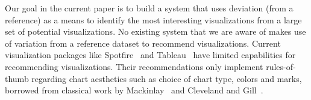 




Our goal in the current paper is to build a system that uses deviation (from a reference) as a means to identify
the most interesting visualizations from a large set of potential visualizations.
No existing system that we are aware of makes use of variation from a reference dataset
to recommend visualizations.  
Current visualization packages like Spotfire~\cite{Ahlberg:1996:SIE:245882.245893} and Tableau~\cite{tableau,polaris} have limited capabilities for 
recommending visualizations.
Their recommendations only implement rules-of-thumb 
regarding chart aesthetics such as choice of
chart type, colors and marks, borrowed from
classical work by Mackinlay~\cite{Mackinlay:1986:ADG:22949.22950} and Cleveland and Gill~\cite{cleveland1984graphical}.

